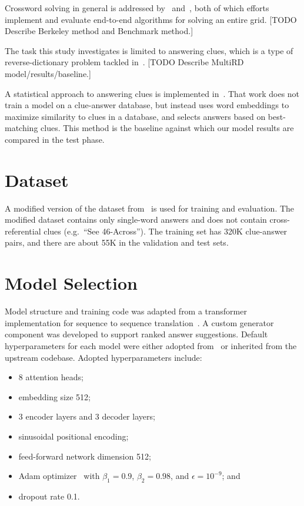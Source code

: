 \documentclass[letterpaper]{article} %
\begin{document}
\begin{NoHyper}
Crossword solving in general is addressed by~\citealp{kulshreshtha2022across} and~\citealp{wallace2022automated},
both of which efforts implement and evaluate end-to-end algorithms for solving an entire grid.
[TODO Describe Berkeley method and Benchmark method.]

The task this study investigates is limited to answering clues, which is a type of reverse-dictionary problem
tackled in~\citealp{zhang2019multichannel}.
[TODO Describe MultiRD model/results/baseline.]

A statistical approach to answering clues is implemented in~\citealp{baselinesolver}.
That work does not train a model on a clue-answer database, but instead uses word embeddings to maximize similarity to
clues in a database, and selects answers based on best-matching clues.
This method is the baseline against which our model results are compared in the test phase.

\section{Dataset}
\label{sec:dataset}

A modified version of the dataset from~\citealp{kulshreshtha2022across} is used for training and evaluation.
The modified dataset contains only single-word answers and does not contain cross-referential clues (e.g.~``See 46-Across'').
The training set has 320K clue-answer pairs, and there are about 55K in the validation and test sets.

\section{Model Selection}
\label{sec:model}

Model structure and training code was adapted from a transformer implementation for sequence to sequence translation~\cite{chegde2022}.
A custom generator component was developed to support ranked answer suggestions.
Default hyperparameters for each model were either adopted from~\citealp{vaswani2017} or inherited from the upstream codebase.
Adopted hyperparameters include:

\begin{itemize}
\item 8 attention heads;
\item embedding size 512;
\item 3 encoder layers and 3 decoder layers;
\item sinusoidal positional encoding;
\item feed-forward network dimension 512;
\item Adam optimizer~\cite{kingma2017adam} with $\beta_1 = 0.9$, $\beta_2 = 0.98$, and $\epsilon = 10^{-9}$; and
\item dropout rate 0.1.
\end{itemize}


\end{NoHyper}
\end{document}
